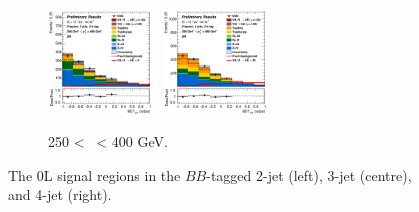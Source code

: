 \begin{figure}[h!]
\begin{subfigure}[b]{\textwidth}
        \includegraphics[width=0.32\textwidth]{Images/VH/Own_fit/postfit_VHbb/Region_distmva_BMax400_BMin250_DSR_J3_TTypebb_T2_L0_Y6051_GlobalFit_conditionnal_mu1.png}
        \includegraphics[width=0.32\textwidth]{Images/VH/Own_fit/postfit_VHbb/Region_distmva_BMax400_BMin250_DSR_J4_TTypebb_T2_L0_Y6051_GlobalFit_conditionnal_mu1.png}
        \caption{250 < \ptv\ < 400 GeV.}
        \label{fig:plots_VHbb_OL_250_SR}
    \end{subfigure}
    \caption{The 0L signal regions in the $BB$-tagged 2-jet (left), 3-jet (centre), and 4-jet (right).}
    \label{fig:plots_VHbb_OL_SR}
\end{figure} 


